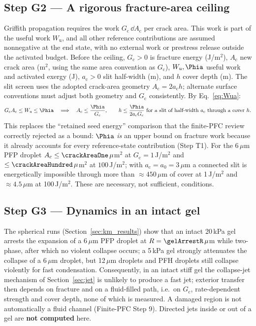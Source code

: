 \subsection{Step G2 --- A rigorous fracture-area ceiling}
Griffith propagation requires the work $G_{\mathrm c}\,\dd A_{\mathrm c}$ per crack area. This work is part of the
useful work $W_{\mathrm u}$, and all other reference contributions are assumed nonnegative at the
end state, with no external work or prestress release outside the activated budget.
Before the ceiling, $G_{\mathrm c}>0$ is fracture energy (J/m$^2$), $A_{\mathrm c}$ new crack area
(m$^2$, using the same area convention as $G_{\mathrm c}$), $W_{\mathrm u},\Phia$ useful work and
activated exergy (J), $a_{\mathrm c}>0$ slit half-width (m), and $h$ cover depth (m).
The slit screen uses the adopted crack-area geometry $A_{\mathrm c}=2a_{\mathrm c}h$;
alternate surface conventions must adjust both geometry and $G_{\mathrm c}$ consistently.
By Eq.~\eqref{eq:Wua}:
\begin{equation}
G_{\mathrm c}A_{\mathrm c}\le W_{\mathrm u}\le\Phia\quad\Longrightarrow\quad A_{\mathrm c}\le\frac{\Phia}{G_{\mathrm c}},\qquad
h\le\frac{\Phia}{2a_{\mathrm c}G_{\mathrm c}}\ \text{for a slit of half-width }a_{\mathrm c}\text{ through a cover }h .\label{eq:crack}
\end{equation}
This replaces the ``retained seed energy'' comparison that the finite-PFC review correctly rejected as a bound:
$\Phia$ \emph{is} an upper bound on fracture work because it already accounts for every reference-state
contribution (Step T1). For the 6\,$\mu$m PFP droplet $A_{\mathrm c}\le\crackAreaOne\,\mu$m$^2$ at
$G_{\mathrm c}=1$\,J/m$^2$ and $\le\crackAreaHundred\,\mu$m$^2$ at $100$\,J/m$^2$; with $a_{\mathrm c}=a_0=3\,\mu$m a
connected slit is energetically impossible through more than $\approx450\,\mu$m of cover at 1\,J/m$^2$ and
$\approx4.5\,\mu$m at 100\,J/m$^2$. These are necessary, not sufficient, conditions.



\subsection{Step G3 --- Dynamics in an intact gel}
The spherical runs (Section~\ref{sec:km_results}) show that an intact 20\,kPa gel arrests the expansion of a
6\,$\mu$m PFP droplet at $R=\gelArrestR\,\mu$m while two-phase, after which no violent collapse occurs; a 5\,kPa
gel strongly attenuates the collapse of a 6\,$\mu$m droplet, but 12\,$\mu$m droplets and PFH droplets still collapse
violently for fast condensation. Consequently, in an intact stiff gel the collapse-jet mechanism of
Section~\ref{sec:jet} is unlikely to produce a fast jet; exterior transfer then depends on fracture and on a
fluid-filled path, i.e.\ on $G_{\mathrm c}$, rate-dependent strength and cover depth, none of which is measured.
A damaged region is not automatically a fluid channel (Finite-PFC Step 9). Directed jets inside or out of a gel
are \textbf{not computed} here.

